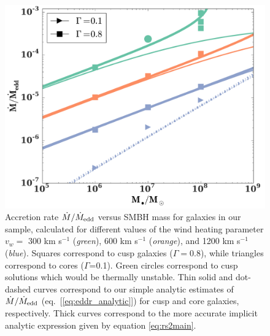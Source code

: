\documentclass[usenatbib,fleqn]{mn2e}
\newcommand{\vwO}{v_{w}}
\begin{document}
\begin{figure}
  \includegraphics[width=\columnwidth]{mdot_mass.pdf}
  \caption{\label{fig:mdot_mass} Accretion rate $\dot{M}/\dot{M}_{\rm
      edd}$ versus SMBH mass for galaxies in our sample, calculated
    for different values of the wind heating parameter $\vwO =$ 300 km
    s$^{-1}$ ({\it green}), 600 km s$^{-1}$ ({\it orange}), and 1200
    km s$^{-1}$ ({\it blue}).  Squares correspond to cusp galaxies
    ($\Gamma=0.8$), while triangles correspond to cores
    ($\Gamma$=0.1). Green circles correspond to cusp solutions which
    would be thermally unstable.  Thin solid and dot-dashed curves
    correspond to our simple analytic estimates of $\dot{M}/\dot{M}_{\rm
      edd}$ (eq.~[\ref{eq:eddr_analytic}]) for cusp and core galaxies,
    respectively.  Thick curves correspond to the more accurate implicit analytic expression given by equation \eqref{eq:rs2main}.}
\end{figure}
\end{document}
